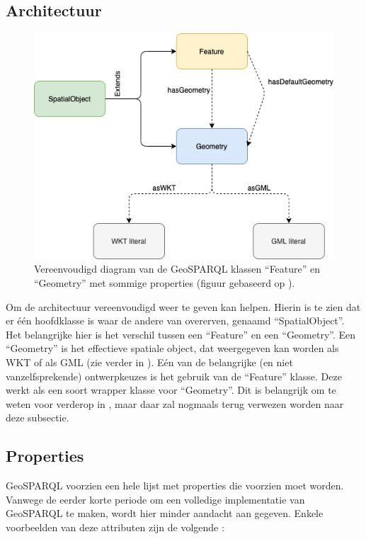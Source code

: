 \subsection{Architectuur}
\label{subsec:geosparql_architecture}
\begin{figure}[ht]
    \centering
    \includegraphics[width=0.5\linewidth]{images/geosparql_architecture.png}
    \caption{Vereenvoudigd diagram van de GeoSPARQL klassen ``Feature'' en ``Geometry'' met sommige properties (figuur gebaseerd op \cite{geosparqlsupport}).}
    \label{fig:geosparql_architecture}
\end{figure}

Om de architectuur vereenvoudigd weer te geven kan  helpen. Hierin is te zien dat er één hoofdklasse is waar de andere van overerven, genaamd ``SpatialObject''. Het belangrijke hier is het verschil tussen een ``Feature'' en een ``Geometry''. Een ``Geometry'' is het effectieve spatiale object, dat weergegeven kan worden als WKT of als GML (zie verder in ). Eén van de belangrijke (en niet vanzelfsprekende) ontwerpkeuzes is het gebruik van de ``Feature'' klasse. Deze werkt als een soort wrapper klasse voor ``Geometry''. Dit is belangrijk om te weten voor verderop in , maar daar zal nogmaals terug verwezen worden naar deze subsectie.

\subsection{Properties}
\label{subsec:geosparql_properties}
GeoSPARQL voorzien een hele lijst met properties die voorzien moet worden. Vanwege de eerder korte periode om een volledige implementatie van GeoSPARQL te maken, wordt hier minder aandacht aan gegeven. Enkele voorbeelden van deze attributen zijn de volgende \cite{ogcdocs}:

